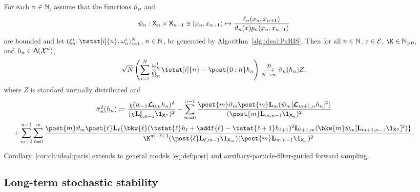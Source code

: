 \begin{corollary} \label{cor:clt:ideal:paris}
For each $n \in \mathbb{N}$, assume that the functions $\vartheta_{n}$ and  
$$
\wgtfuncideal{n} : \Xset_n \times \Xset_{n + 1} \ni (x_n, x_{n + 1}) \mapsto \frac{\ud{n}(x_n, x_{n + 1})}{\adjfuncforward{n}(x) \kissforward{n}{n}(x_n, x_{n + 1})} 
$$
are bounded and let $(\epart{n}{i}, \tstat[i]{n}, \ewght{n}{i})_{i = 1}^\N$, $n \in \mathbb{N}$, be generated by Algorithm~\ref{alg:ideal:PaRIS}. Then for all $n \in \mathbb{N}$, $\varepsilon \in \mathcal{E}$, $\K \in \nsetpos$, and $h_n \in \mathsf{A}(\mathcal{X}^n)$, 
$$
\sqrt{\N} \left( \sum_{i = 1}^\N \frac{\ewght{n}{i}}{\sumwght{n}} \tstat[i]{n} - \post{0:n} h_n  \right) \dlim \bar{\sigma}_n (h_n) Z, 
$$
where $Z$ is standard normally distributed and
\begin{multline} \label{eq:as:var:ideal:PaRIS}
\bar{\sigma}^2_n (h_n) 
\eqdef \frac{\chi(\initwgtfunc \retroknorm_{0, n} h_n)^2}{(\chi \ukmod{0, n - 1} \1_{\Xset^n})^2} + \sum_{m = 0}^{n - 1} \frac{\post{m} \adjfuncforward{m} \post{m} \uk{m}(\wgtfuncideal{m} [\retroknorm_{m + 1, n} h_n ]^2)}{(\post{m} \uk{m, n - 1} \1_{\Xset_n})^2} \\
+ \sum_{m = 0}^{n - 1} \sum_{\ell = 0}^m \frac{\post{m} \adjfuncforward{m} \post{\ell} \uk{\ell} \{\bkw{\ell}(\tstat{\ell} h_{\ell} + \addf{\ell} - \tstat{\ell + 1} h_{\ell +1})^2 \uk{\ell + 1, m}( \bkw{m} \wgtfuncideal{m} [\uk{m + 1, n - 1} \1_{\Xset^n}]^2
)\}}{\K^{m - \ell + 1} (\post{\ell} \uk{\ell, m - 1} \1_{\Xset_m})(\post{m} \uk{m, n - 1} \1_{\Xset_n})^2}. 
\end{multline}
\end{corollary}

Corollary~\ref{cor:clt:ideal:paris} extends \cite[Corollary~5]{olsson:westerborn:2017} to general models \eqref{eq:def:post} and auxiliary-particle-filter-guided forward sampling. 

\subsection{Long-term stochastic stability}

